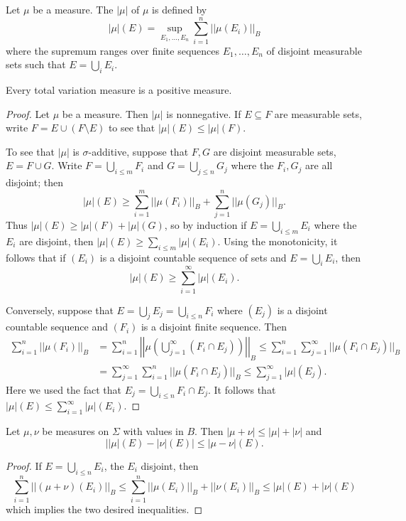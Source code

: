 \begin{definition}
Let $\mu$ be a measure. The  $|\mu|$ of $\mu$ is defined by
\[|\mu|(E) = \sup_{E_{1}, \dots, E_{n}} \sum_{i=1}^{n} ||\mu(E_{i})||_{B}\]
where the supremum ranges over finite sequences $E_{1}, \dots, E_{n}$ of disjoint measurable sets such that $E = \bigcup_{i} E_{i}$.
\end{definition}

\begin{theorem}
Every total variation measure is a positive measure.
\end{theorem}
\begin{proof}
Let $\mu$ be a measure. Then $|\mu|$ is nonnegative. If $E \subseteq F$ are measurable sets, write $F = E \cup (F \setminus E)$ to see that $|\mu|(E) \leq |\mu|(F)$.

To see that $|\mu|$ is $\sigma$-additive, suppose that $F,G$ are disjoint measurable sets, $E = F \cup G$.
Write $F = \bigcup_{i \leq m} F_{i}$ and $G = \bigcup_{j \leq n} G_{j}$ where the $F_{i},G_{j}$ are all disjoint; then
\[|\mu|(E) \geq \sum_{i=1}^{m} ||\mu(F_{i})||_{B} + \sum_{j=1}^{n} ||\mu(G_{j})||_{B}.\]
Thus $|\mu|(E) \geq |\mu|(F) + |\mu|(G)$, so by induction if $E = \bigcup_{i \leq m} E_{i}$ where the $E_{i}$ are disjoint, then $|\mu|(E) \geq \sum_{i \leq m} |\mu|(E_{i})$.
Using the monotonicity, it follows that if $(E_{i})$ is a disjoint countable sequence of sets and $E = \bigcup_{i} E_{i}$, then
\[|\mu|(E) \geq \sum_{i=1}^{\infty} |\mu|(E_{i}).\]

Conversely, suppose that $E = \bigcup_{j} E_{j} = \bigcup_{i\leq n} F_{i}$ where $(E_{j})$ is a disjoint countable sequence and $(F_{i})$ is a disjoint finite sequence. Then
\begin{align*}
\sum_{i=1}^{n} ||\mu(F_{i})||_{B} &= \sum_{i=1}^{n} \left|\left|\mu\left(\bigcup_{j=1}^{\infty} \left(F_{i} \cap E_{j}\right)\right)\right|\right|_{B} \leq \sum_{i=1}^{n} \sum_{j=1}^{\infty} ||\mu(F_{i} \cap E_{j})||_{B} \\
&= \sum_{j=1}^{\infty} \sum_{i=1}^{n} ||\mu(F_{i} \cap E_{j})||_{B} \leq \sum_{j=1}^{\infty} |\mu|(E_{j}).
\end{align*}
Here we used the fact that $E_{j} = \bigcup_{i \leq n} F_{i} \cap E_{j}$. It follows that $|\mu|(E) \leq \sum_{i=1}^{\infty} |\mu|(E_{i})$.
\end{proof}

\begin{theorem}\label{reverse triangle inequality}
Let $\mu,\nu$ be measures on $\Sigma$ with values in $B$. Then $|\mu + \nu| \leq |\mu| + |\nu|$ and
\[||\mu|(E) - |\nu|(E)| \leq |\mu - \nu|(E).\]
\end{theorem}
\begin{proof}
If $E = \bigcup_{i \leq n} E_{i}$, the $E_{i}$ disjoint, then
\[\sum_{i=1}^{n} ||(\mu + \nu)(E_{i})||_{B} \leq \sum_{i=1}^{n} ||\mu(E_{i})||_{B} + ||\nu(E_{i})||_{B} \leq |\mu|(E) + |\nu|(E)\]
which implies the two desired inequalities.
\end{proof}

